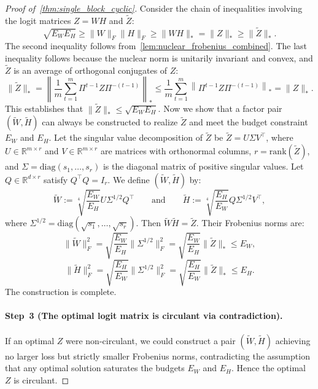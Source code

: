 \documentclass[11pt]{article}
\begin{document}
\begin{proof}[Proof of~\cref{thm:single_block_cyclic}]
Consider the chain of inequalities involving the logit matrices \(Z=WH\) and \(\widetilde{Z}\):
\begin{equation}
\label{eq:budget_chain}
\sqrt{E_W E_H} \ge \|W\|_{F}\|H\|_{F} \ge \|WH\|_{*} = \|Z\|_{*} \ge \|\widetilde{Z}\|_{*}.
\end{equation}
The second inequality follows from~\cref{lem:nuclear_frobenius_combined}. The last inequality follows because the nuclear norm is unitarily invariant and convex, and $\widetilde Z$ is an average of orthogonal conjugates of $Z$:
\[
\|\widetilde Z\|_* = \left\|\frac{1}{m}\sum_{t=1}^{m} \Pi^{t-1} Z \Pi^{-(t-1)}\right\|_*
\le \frac{1}{m}\sum_{t=1}^{m} \left\|\Pi^{t-1} Z \Pi^{-(t-1)}\right\|_* = \|Z\|_*.
\]
This establishes that \(\|\widetilde{Z}\|_* \le \sqrt{E_W E_H}\). Now we show that a factor pair \((\widetilde{W}, \widetilde{H})\) can always be constructed to realize \(\widetilde{Z}\) and meet the budget constraint \(E_W\) and \(E_H\). 
Let the singular value decomposition of \(\widetilde{Z}\) be \( \widetilde{Z} = U\Sigma V^\top \), where \(U \in \mathbb{R}^{m \times r}\) and \(V \in \mathbb{R}^{m \times r}\) are matrices with orthonormal columns, \(r = \mathrm{rank}(\widetilde{Z})\), and \(\Sigma = \mathrm{diag}(s_1, \dots, s_r)\) is the diagonal matrix of positive singular values. Let \(Q\in\mathbb{R}^{d\times r}\) satisfy \(Q^\top Q=I_r\).
We define \((\widetilde{W}, \widetilde{H})\) by:
\begin{equation}
    \label{eq:wh_construction}
\widetilde{W} := \sqrt[4]{\frac{E_W}{E_H}} U\Sigma^{1/2}Q^\top \qquad \text{and} \qquad \widetilde{H} := \sqrt[4]{\frac{E_H}{E_W}} Q\Sigma^{1/2}V^\top,
\end{equation}
where \(\Sigma^{1/2} = \mathrm{diag}(\sqrt{s_1}, \dots, \sqrt{s_r})\). Then \(\widetilde W\widetilde H=\widetilde Z\).
Their Frobenius norms are:
\begin{equation}
\label{eq:budget_frobenius_W}
\|\widetilde{W}\|_F^2 = \sqrt{\frac{E_W}{E_H}} \|\Sigma^{1/2}\|_F^2 = \sqrt{\frac{E_W}{E_H}} \|\widetilde{Z}\|_{*} \le E_W,
\end{equation}
\begin{equation}
\label{eq:budget_frobenius_H}
\|\widetilde{H}\|_F^2 = \sqrt{\frac{E_H}{E_W}} \|\Sigma^{1/2}\|_F^2 = \sqrt{\frac{E_H}{E_W}} \|\widetilde{Z}\|_{*} \le E_H.
\end{equation}
The construction is complete. 

\paragraph{Step~3 (The optimal logit matrix is circulant via contradiction).}
If an optimal \(Z\) were non-circulant, we could construct a pair \((\widetilde{W}, \widetilde{H})\) achieving no larger loss but strictly smaller Frobenius norms, contradicting the assumption that any optimal solution saturates the budgets \(E_W\) and \(E_H\). Hence the optimal \(Z\) is circulant.


\end{proof}
\end{document}
